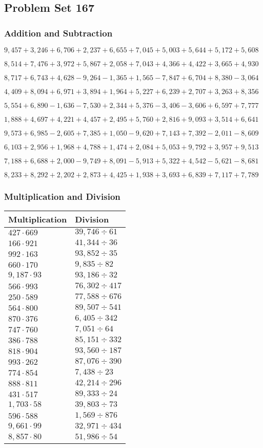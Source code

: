 \hypertarget{problem-set-167}{%
\subsection{Problem Set 167}\label{problem-set-167}}

\hypertarget{addition-and-subtraction}{%
\subsubsection{Addition and
Subtraction}\label{addition-and-subtraction}}

\(9,457+3,246+6,706+2,237+6,655+7,045+5,003+5,644+5,172+5,608\)

\(8,514+7,476+3,972+5,867+2,058+7,043+4,366+4,422+3,665+4,930\)

\(8,717+6,743+4,628-9,264-1,365+1,565-7,847+6,704+8,380-3,064\)

\(4,409+8,094+6,971+3,894+1,964+5,227+6,239+2,707+3,263+8,356\)

\(5,554+6,890-1,636-7,530+2,344+5,376-3,406-3,606+6,597+7,777\)

\(1,888+4,697+4,221+4,457+2,495+5,760+2,816+9,093+3,514+6,641\)

\(9,573+6,985-2,605+7,385+1,050-9,620+7,143+7,392-2,011-8,609\)

\(6,103+2,956+1,968+4,788+1,474+2,084+5,053+9,792+3,957+9,513\)

\(7,188+6,688+2,000-9,749+8,091-5,913+5,322+4,542-5,621-8,681\)

\(8,233+8,292+2,202+2,873+4,425+1,938+3,693+6,839+7,117+7,789\)

\hypertarget{multiplication-and-division}{%
\subsubsection{Multiplication and
Division}\label{multiplication-and-division}}

\begin{longtable}[]{@{}ll@{}}
\toprule
Multiplication & Division\tabularnewline
\midrule
\endhead
\(427\cdot669\) & \(39,746÷61\)\tabularnewline
\(166\cdot921\) & \(41,344÷36\)\tabularnewline
\(992\cdot163\) & \(93,852÷35\)\tabularnewline
\(660\cdot170\) & \(9,835÷82\)\tabularnewline
\(9,187\cdot93\) & \(93,186÷32\)\tabularnewline
\(566\cdot993\) & \(76,302÷417\)\tabularnewline
\(250\cdot589\) & \(77,588÷676\)\tabularnewline
\(564\cdot800\) & \(89,507÷541\)\tabularnewline
\(870\cdot376\) & \(6,405÷342\)\tabularnewline
\(747\cdot760\) & \(7,051÷64\)\tabularnewline
\(386\cdot788\) & \(85,151÷332\)\tabularnewline
\(818\cdot904\) & \(93,560÷187\)\tabularnewline
\(993\cdot262\) & \(87,076÷390\)\tabularnewline
\(774\cdot854\) & \(7,438÷23\)\tabularnewline
\(888\cdot811\) & \(42,214÷296\)\tabularnewline
\(431\cdot517\) & \(89,333÷24\)\tabularnewline
\(1,703\cdot58\) & \(39,803÷73\)\tabularnewline
\(596\cdot588\) & \(1,569÷876\)\tabularnewline
\(9,661\cdot99\) & \(32,971÷434\)\tabularnewline
\(8,857\cdot80\) & \(51,986÷54\)\tabularnewline
\bottomrule
\end{longtable}
